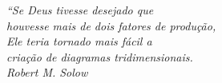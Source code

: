 \begin{epigrafe}
\vspace*{\fill}
\begin{flushright}
\textit{
``Se Deus tivesse desejado que\\
houvesse mais de dois fatores de produção,\\
Ele teria tornado mais fácil a\\
criação de diagramas tridimensionais.\\
Robert M. Solow
}
\end{flushright}
\end{epigrafe}
